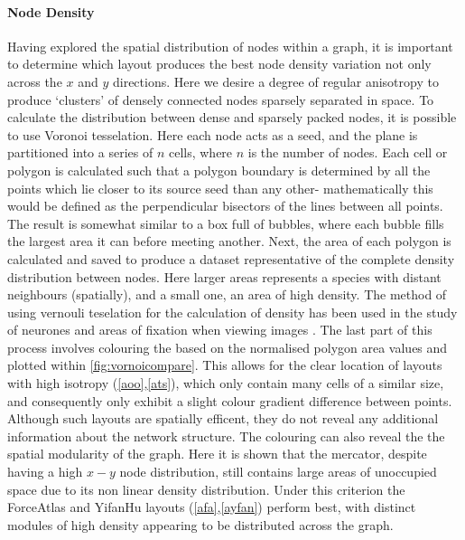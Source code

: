\paragraph{Node Density}\label{sec:nodedensitya}
Having explored the spatial distribution of nodes within a graph, it is important to determine which layout produces the best node density variation not only across the $x$ and $y$ directions. Here we desire a degree of regular anisotropy to produce `clusters' of densely connected nodes sparsely separated in space. To calculate the distribution between dense and sparsely packed nodes, it is possible to use Voronoi tesselation. Here each node acts as a seed, and the plane is partitioned into a series of $n$ cells, where $n$ is the number of nodes. Each cell or polygon is calculated such that a polygon boundary is determined by all the points which lie closer to its source seed than any other- mathematically this would be defined as the perpendicular bisectors of the lines between all points. The result is somewhat similar to a box full of bubbles, where each bubble fills the largest area it can before meeting another. Next, the area of each polygon is calculated and saved to produce a dataset representative of the complete density distribution between nodes. Here larger areas represents a species with distant neighbours (spatially), and a small one, an area of high density. The method of using vernouli teselation for the calculation of density has been used in the study of neurones \citep{neurone} and areas of fixation when viewing images \citep{fixation}. 
The last part of this process involves colouring the based on the normalised polygon area values and plotted within \autoref{fig:vornoicompare}. This allows for the clear location of layouts with high isotropy (\autoref{aoo},\autoref{ats}), which only contain many cells of a similar size, and consequently only exhibit a slight colour gradient difference between points. Although such layouts are spatially efficent, they do not reveal any additional information about the network structure. 
The colouring can also reveal the the spatial modularity of the graph. Here it is shown that the mercator, despite having a high $x-y$ node distribution, still contains large areas of unoccupied space due to its non linear density distribution. Under this criterion the ForceAtlas and YifanHu layouts (\autoref{afa},\autoref{ayfan}) perform best, with distinct modules of high density appearing to be distributed across the graph. 



